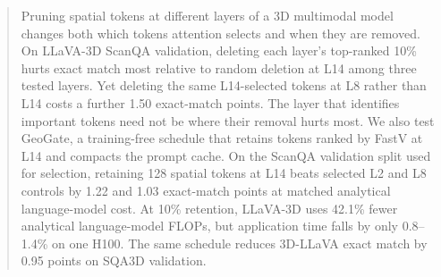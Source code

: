 \begin{abstract}
Pruning spatial tokens at different layers of a 3D multimodal model changes both which tokens attention selects and when they are removed. On LLaVA-3D ScanQA validation, deleting each layer's top-ranked 10\% hurts exact match most relative to random deletion at L14 among three tested layers. Yet deleting the same L14-selected tokens at L8 rather than L14 costs a further 1.50 exact-match points. The layer that identifies important tokens need not be where their removal hurts most. We also test GeoGate, a training-free schedule that retains tokens ranked by FastV at L14 and compacts the prompt cache. On the ScanQA validation split used for selection, retaining 128 spatial tokens at L14 beats selected L2 and L8 controls by 1.22 and 1.03 exact-match points at matched analytical language-model cost. At 10\% retention, LLaVA-3D uses 42.1\% fewer analytical language-model FLOPs, but application time falls by only 0.8--1.4\% on one H100. The same schedule reduces 3D-LLaVA exact match by 0.95 points on SQA3D validation.
\end{abstract}
